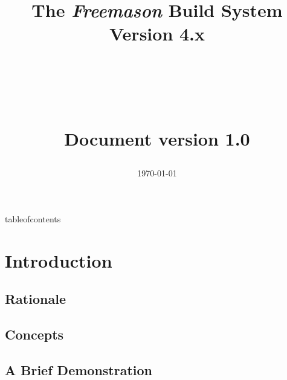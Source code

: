 \documentclass[a4paper]{book}
\begin{document}

\title
    {
    \begin{Huge}The \textit{Freemason} Build System \\ \vspace{.5 cm} Version 4.x \end{Huge}
    \\ \vspace{1 cm}
    \\ \vspace{2 cm}
    \begin{normalsize}Document version 1.0\end{normalsize}
    }
\date{\today}

%
\draftstring{}%
%
\watermark%
\maketitle%

\watermarkgraphic{}%
\watermark%
%
%


{tableofcontents}%
\tableofcontents%


\chapter{Introduction}

\section{Rationale}
\section{Concepts}
\section{A Brief Demonstration}

\end{document}

